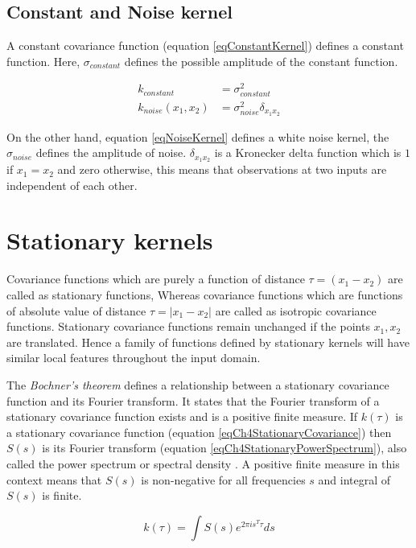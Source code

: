 \subsection{Constant and Noise kernel}
A constant covariance function (equation \ref{eqConstantKernel}) defines a constant function. Here, $\sigma_{constant}$ defines the possible amplitude of the constant function.

\begin{align}
k_{constant} & = \sigma^2_{constant} \label{eqConstantKernel} \\
k_{noise}(x_{1}, x_{2}) & = \sigma^2_{noise}\delta_{x_{1}x_{2}} \label{eqNoiseKernel}
\end{align}

On the other hand, equation \ref{eqNoiseKernel} defines a white noise kernel, the $\sigma_{noise}$ defines the amplitude of noise. $\delta_{x_{1}x_{2}}$ is a Kronecker delta function which is $1$ if $x_{1} = x_{2}$ and zero otherwise, this means that observations at two inputs are independent of each other. 

\section{Stationary kernels} \label{secStationaryKernels}
Covariance functions which are purely a function of distance $\tau = (x_{1} - x_{2})$ are called as stationary functions, Whereas covariance functions which are functions of absolute value of distance $\tau = |x_{1} - x_{2}|$ are called as isotropic covariance functions. Stationary covariance functions remain unchanged if the points $x_{1}, x_{2}$ are translated. Hence a family of functions defined by stationary kernels will have similar local features throughout the input domain. 

The \textit{Bochner's theorem} defines a relationship between a stationary covariance function and its Fourier transform. It states that the Fourier transform of a stationary covariance function exists and is a positive finite measure. If $k(\tau)$ is a stationary covariance function (equation \ref{eqCh4StationaryCovariance}) then $S(s)$ is its Fourier transform (equation \ref{eqCh4StationaryPowerSpectrum}), also called the power spectrum or spectral density \cite{bochner1959lectures, Stein1999Springer, cox1977theory}. A positive finite measure in this context means that $S(s)$ is non-negative for all frequencies $s$ and integral of $S(s)$ is finite.

\begin{equation}\label{eqCh4StationaryCovariance}
    k(\tau) = \int S(s) e^{2 \pi is^{T} \tau}ds
\end{equation}

